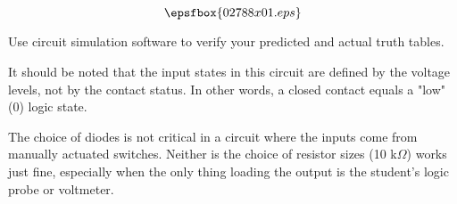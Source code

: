 

$$\epsfbox{02788x01.eps}$$

\vfil \eject






Use circuit simulation software to verify your predicted and actual truth tables.







It should be noted that the input states in this circuit are defined by the voltage levels, not by the contact status.  In other words, a closed contact equals a "low" (0) logic state.

The choice of diodes is not critical in a circuit where the inputs come from manually actuated switches.  Neither is the choice of resistor sizes (10 k$\Omega$) works just fine, especially when the only thing loading the output is the student's logic probe or voltmeter.




